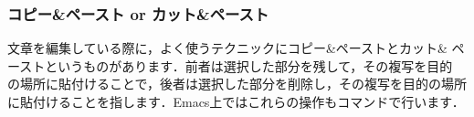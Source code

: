 \documentclass{jarticle}
\begin{document}





\subsubsection{コピー\&ペースト or カット\&ペースト}
文章を編集している際に，よく使うテクニックにコピー\&ペーストとカット\&
ペーストというものがあります．前者は選択した部分を残して，その複写を目的
の場所に貼付けることで，後者は選択した部分を削除し，その複写を目的の場所
に貼付けることを指します．Emacs上ではこれらの操作もコマンドで行います．
\end{document}
